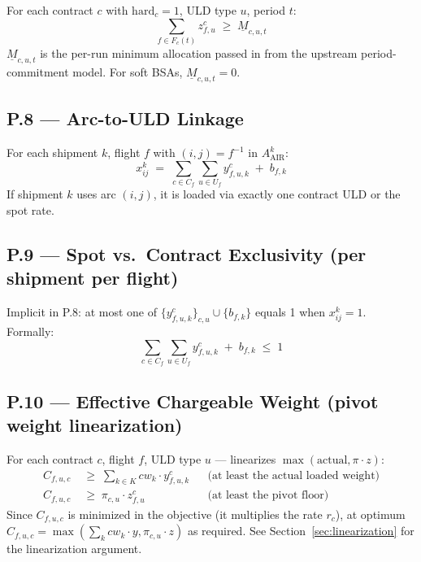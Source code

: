 \documentclass[11pt,a4paper]{article}
\theoremstyle{definition}
\begin{document}
For each contract $c$ with $\text{hard}_c = 1$, ULD type $u$, period $t$:
\begin{equation}
  \sum_{f \in F_c(t)} z_{f,u}^c \;\geq\; \underline{M}_{c,u,t}
  \label{eq:P7}
\end{equation}
$\underline{M}_{c,u,t}$ is the per-run minimum allocation passed in from the upstream
period-commitment model. For soft BSAs, $\underline{M}_{c,u,t} = 0$.

\subsection*{P.8 — Arc-to-ULD Linkage}

For each shipment $k$, flight $f$ with $(i,j) = f^{-1}$ in $A^k_{\text{AIR}}$:
\begin{equation}
  x_{ij}^k \;=\; \sum_{c \in C_f} \sum_{u \in U_f} y_{f,u,k}^c \;+\; b_{f,k}
  \label{eq:P8}
\end{equation}
If shipment $k$ uses arc $(i,j)$, it is loaded via exactly one contract ULD or the spot rate.

\subsection*{P.9 — Spot vs.\ Contract Exclusivity (per shipment per flight)}

Implicit in P.8: at most one of $\{y_{f,u,k}^c\}_{c,u} \cup \{b_{f,k}\}$ equals 1 when $x_{ij}^k = 1$.
Formally:
\begin{equation}
  \sum_{c \in C_f} \sum_{u \in U_f} y_{f,u,k}^c \;+\; b_{f,k} \;\leq\; 1
  \label{eq:P9}
\end{equation}

\subsection*{P.10 — Effective Chargeable Weight (pivot weight linearization)}

For each contract $c$, flight $f$, ULD type $u$ — linearizes $\max(\text{actual}, \pi \cdot z)$:
\begin{align}
  C_{f,u,c} \;&\geq\; \sum_{k \in K} cw_k \cdot y_{f,u,k}^c &&\text{(at least the actual loaded weight)} \label{eq:P10a} \\
  C_{f,u,c} \;&\geq\; \pi_{c,u} \cdot z_{f,u}^c &&\text{(at least the pivot floor)} \label{eq:P10b}
\end{align}
Since $C_{f,u,c}$ is minimized in the objective (it multiplies the rate $r_c$), at optimum
$C_{f,u,c} = \max(\sum_k cw_k \cdot y, \pi_{c,u} \cdot z)$ as required. See Section~\ref{sec:linearization} for the linearization argument.
\end{document}
